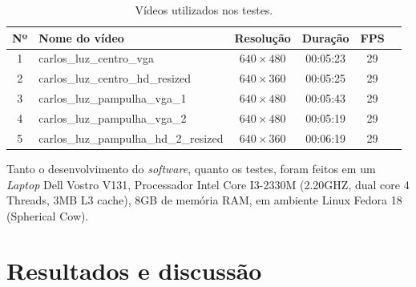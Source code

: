 \begin{table}[ht]
  \caption{Vídeos utilizados nos testes.}
  \label{tab:videos_teste}
  \begin{center}
    \begin{tabular}{clcccc}
    \toprule
    \textbf{Nº} & \textbf{Nome do vídeo} & \textbf{Resolução} & \textbf{Duração} & \textbf{FPS} \\
    \midrule
      1 & carlos\_luz\_centro\_vga & $ 640\times 480 $ & 00:05:23 & 29 \\
      2 & carlos\_luz\_centro\_hd\_resized & $ 640\times 360 $ & 00:05:25 & 29 \\
      3 & carlos\_luz\_pampulha\_vga\_1 & $ 640\times 480 $ & 00:05:43 & 29 \\
      4 & carlos\_luz\_pampulha\_vga\_2 & $ 640\times 480 $ & 00:05:19 & 29 \\
      5 & carlos\_luz\_pampulha\_hd\_2\_resized & $ 640\times 360 $ & 00:06:19 & 29 \\
    \bottomrule
    \end{tabular}
  \end{center}
\end{table}

Tanto o desenvolvimento do \textit{software}, quanto os testes, foram feitos em um \textit{Laptop} Dell Vostro V131, Processador Intel Core I3-2330M (2.20GHZ, dual core 4 Threads, 3MB L3 cache), 8GB de memória RAM, em ambiente Linux Fedora 18 (Spherical Cow).


\section{Resultados e discussão} %
\label{sec:resultados_e_discuss_o}

